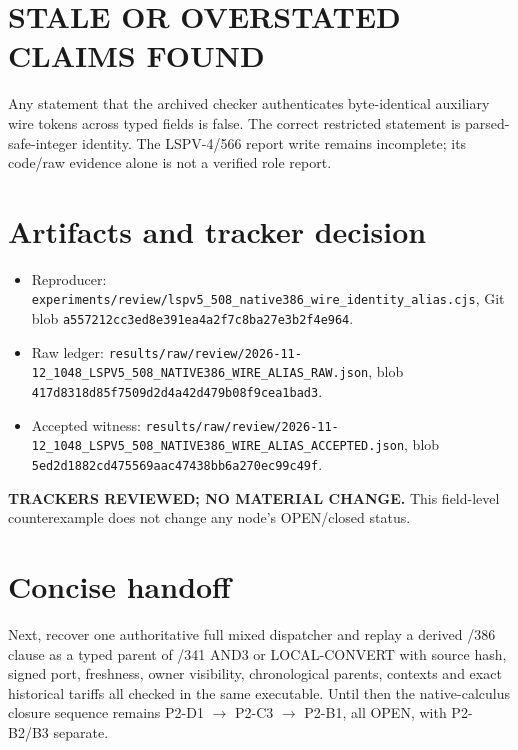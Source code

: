 \documentclass[11pt]{article}
\begin{document}
\section*{STALE OR OVERSTATED CLAIMS FOUND}
Any statement that the archived checker authenticates byte-identical auxiliary
wire tokens across typed fields is false.  The correct restricted statement is
parsed-safe-integer identity.  The LSPV-4/566 report write remains incomplete;
its code/raw evidence alone is not a verified role report.

\section*{Artifacts and tracker decision}
\begin{itemize}
\item Reproducer: \texttt{experiments/review/lspv5\_508\_native386\_wire\_identity\_alias.cjs}, Git blob \texttt{a557212cc3ed8e391ea4a2f7c8ba27e3b2f4e964}.
\item Raw ledger: \texttt{results/raw/review/2026-11-12\_1048\_LSPV5\_508\_NATIVE386\_WIRE\_ALIAS\_RAW.json}, blob \texttt{417d8318d85f7509d2d4a42d479b08f9cea1bad3}.
\item Accepted witness: \texttt{results/raw/review/2026-11-12\_1048\_LSPV5\_508\_NATIVE386\_WIRE\_ALIAS\_ACCEPTED.json}, blob \texttt{5ed2d1882cd475569aac47438bb6a270ec99c49f}.
\end{itemize}
\textbf{TRACKERS REVIEWED; NO MATERIAL CHANGE.}  This field-level counterexample
does not change any node's OPEN/closed status.

\section*{Concise handoff}
Next, recover one authoritative full mixed dispatcher and replay a derived
/386 clause as a typed parent of /341 AND3 or LOCAL-CONVERT with source hash,
signed port, freshness, owner visibility, chronological parents, contexts and
exact historical tariffs all checked in the same executable.  Until then the
native-calculus closure sequence remains P2-D1 $\to$ P2-C3 $\to$ P2-B1, all
OPEN, with P2-B2/B3 separate.
\end{document}
